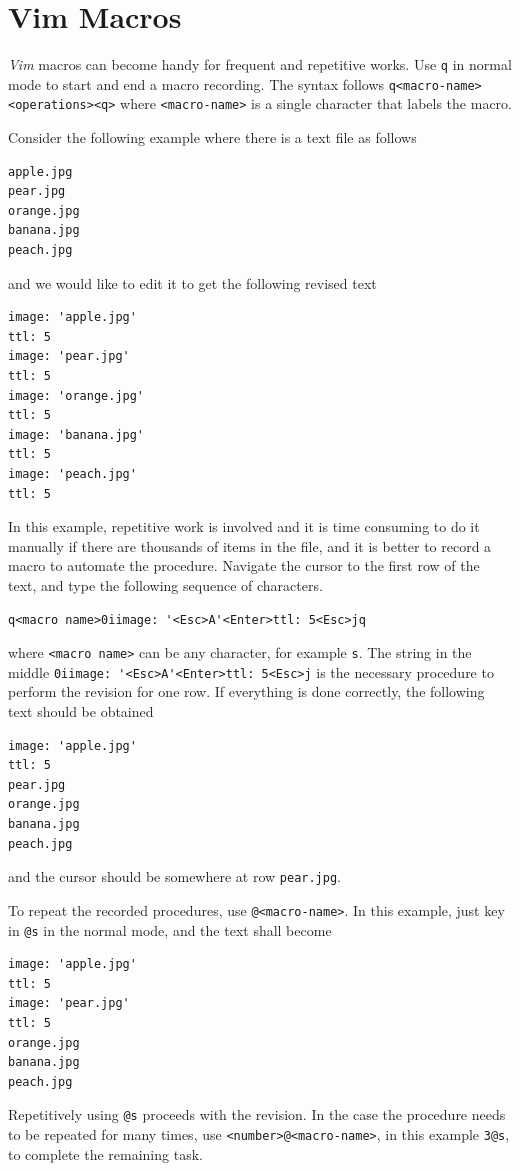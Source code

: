 \section{Vim Macros}

\textit{Vim} macros can become handy for frequent and repetitive works. Use \verb|q| in normal mode to start and end a macro recording. The syntax follows \verb|q<macro-name><operations><q>| where \verb|<macro-name>| is a single character that labels the macro.

Consider the following example where there is a text file as follows
\begin{lstlisting}
apple.jpg
pear.jpg
orange.jpg
banana.jpg
peach.jpg
\end{lstlisting}
and we would like to edit it to get the following revised text
\begin{lstlisting}
image: 'apple.jpg'
ttl: 5
image: 'pear.jpg'
ttl: 5
image: 'orange.jpg'
ttl: 5
image: 'banana.jpg'
ttl: 5
image: 'peach.jpg'
ttl: 5
\end{lstlisting}

In this example, repetitive work is involved and it is time consuming to do it manually if there are thousands of items in the file, and it is better to record a macro to automate the procedure. Navigate the cursor to the first row of the text, and type the following sequence of characters.
\begin{lstlisting}
q<macro name>0iimage: '<Esc>A'<Enter>ttl: 5<Esc>jq
\end{lstlisting}
where \verb|<macro name>| can be any character, for example \verb|s|. The string in the middle \verb|0iimage: '<Esc>A'<Enter>ttl: 5<Esc>j| is the necessary procedure to perform the revision for one row. If everything is done correctly, the following text should be obtained
\begin{lstlisting}
image: 'apple.jpg'
ttl: 5
pear.jpg
orange.jpg
banana.jpg
peach.jpg
\end{lstlisting}
and the cursor should be somewhere at row \verb|pear.jpg|.

To repeat the recorded procedures, use \verb|@<macro-name>|. In this example, just key in \verb|@s| in the normal mode, and the text shall become
\begin{lstlisting}
image: 'apple.jpg'
ttl: 5
image: 'pear.jpg'
ttl: 5
orange.jpg
banana.jpg
peach.jpg
\end{lstlisting}

Repetitively using \verb|@s| proceeds with the revision. In the case the procedure needs to be repeated for many times, use \verb|<number>@<macro-name>|, in this example \verb|3@s|, to complete the remaining task.

